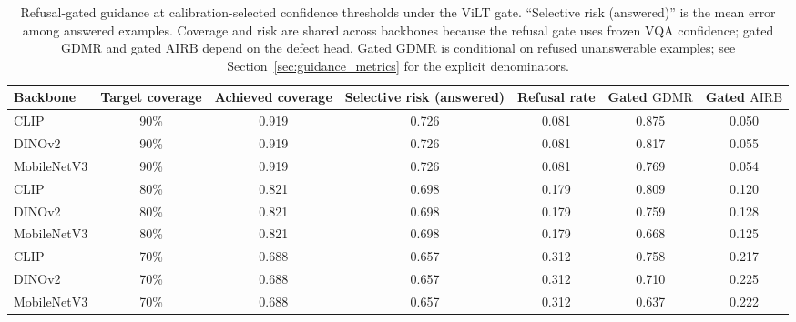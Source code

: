 \documentclass{ieeeaccess}
\newcommand{\arr}{\mathrm{GDMR}}
\newcommand{\frr}{\mathrm{AIRB}}
\newcommand{\clip}{CLIP}
\newcommand{\dinov}{DINOv2}
\newcommand{\mobilenet}{MobileNetV3}
\newcommand{\vilt}{ViLT}
\begin{document}
\begin{table}[t]
    \centering
    \caption{Refusal-gated guidance at calibration-selected confidence thresholds under the \vilt{} gate. ``Selective risk (answered)'' is the mean error among answered examples. Coverage and risk are shared across backbones because the refusal gate uses frozen VQA confidence; gated $\arr$ and gated $\frr$ depend on the defect head. Gated $\arr$ is conditional on refused unanswerable examples; see Section~\ref{sec:guidance_metrics} for the explicit denominators.}
    \label{tab:gated_recovery}
    \small
    \begin{tabular}{lcccccc}
        \toprule
        Backbone & Target coverage & Achieved coverage & Selective risk (answered) & Refusal rate & Gated $\arr$ & Gated $\frr$ \\
        \midrule
        \clip{}      & 90\% & 0.919 & 0.726 & 0.081 & 0.875 & 0.050 \\
        \dinov{}     & 90\% & 0.919 & 0.726 & 0.081 & 0.817 & 0.055 \\
        \mobilenet{} & 90\% & 0.919 & 0.726 & 0.081 & 0.769 & 0.054 \\
        \midrule
        \clip{}      & 80\% & 0.821 & 0.698 & 0.179 & 0.809 & 0.120 \\
        \dinov{}     & 80\% & 0.821 & 0.698 & 0.179 & 0.759 & 0.128 \\
        \mobilenet{} & 80\% & 0.821 & 0.698 & 0.179 & 0.668 & 0.125 \\
        \midrule
        \clip{}      & 70\% & 0.688 & 0.657 & 0.312 & 0.758 & 0.217 \\
        \dinov{}     & 70\% & 0.688 & 0.657 & 0.312 & 0.710 & 0.225 \\
        \mobilenet{} & 70\% & 0.688 & 0.657 & 0.312 & 0.637 & 0.222 \\
        \bottomrule
    \end{tabular}
\end{table}
\end{document}
